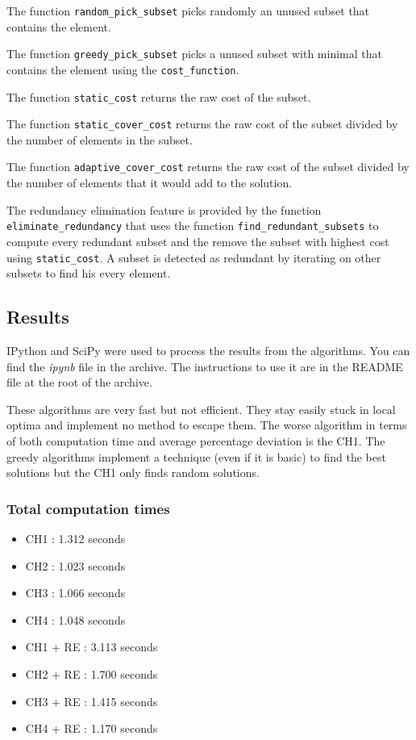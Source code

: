 \documentclass[a4paper,12pt]{article}
\begin{document}
The function \texttt{random\_pick\_subset} picks randomly an unused subset that contains the element.

The function \texttt{greedy\_pick\_subset} picks a unused subset with minimal that contains the element using the \texttt{cost\_function}.

The function \texttt{static\_cost} returns the raw cost of the subset.

The function \texttt{static\_cover\_cost} returns the raw cost of the subset divided by the number of elements in the subset.

The function \texttt{adaptive\_cover\_cost} returns the raw cost of the subset divided by the number of elements that it would add to the solution.

The redundancy elimination feature is provided by the function \texttt{eliminate\_redundancy} that uses the function \texttt{find\_redundant\_subsets} to compute every redundant subset and the remove the subset with highest cost using \texttt{static\_cost}.
A subset is detected as redundant by iterating on other subsets to find his every element.

\subsection{Results}

IPython and SciPy were used to process the results from the algorithms. You can find the \textit{ipynb} file in the archive. The instructions to use it are in the README file at the root of the archive.

These algorithms are very fast but not efficient. They stay easily stuck in local optima and implement no method to escape them. The worse algorithm in terms of both computation time and average percentage deviation is the CH1. The greedy algorithms implement a technique (even if it is basic) to find the best solutions but the CH1 only finds random solutions.

\subsubsection{Total computation times}

\begin{itemize}
    \item CH1 : 1.312 seconds
    \item CH2 : 1.023 seconds
    \item CH3 : 1.066 seconds
    \item CH4 : 1.048 seconds
    \item CH1 + RE : 3.113 seconds
    \item CH2 + RE : 1.700 seconds
    \item CH3 + RE : 1.415 seconds
    \item CH4 + RE : 1.170 seconds
\end{itemize}
\end{document}
